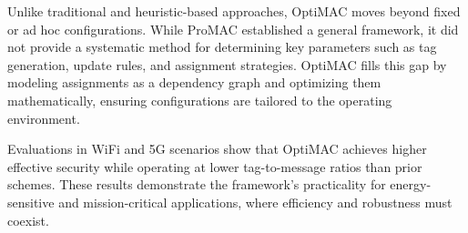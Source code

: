 Unlike traditional and heuristic-based approaches, OptiMAC moves beyond fixed or ad hoc configurations. While ProMAC established a general framework, it did not provide a systematic method for determining key parameters such as tag generation, update rules, and assignment strategies. OptiMAC fills this gap by modeling assignments as a dependency graph and optimizing them mathematically, ensuring configurations are tailored to the operating environment.

Evaluations in WiFi and 5G scenarios show that OptiMAC achieves higher effective security while operating at lower tag-to-message ratios than prior schemes. These results demonstrate the framework’s practicality for energy-sensitive and mission-critical applications, where efficiency and robustness must coexist.

